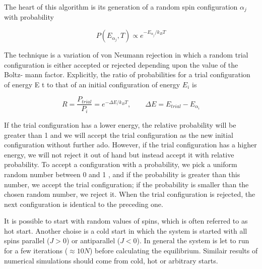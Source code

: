 \documentclass[12pt]{article}
\theoremstyle{plain}
\begin{document}
\vspace{2mm}

\par The heart of this algorithm is its generation of a random spin configuration $\alpha_j$ with
probability

\vspace{2mm}

\begin{equation*}
    P(E_{\alpha_j}, T) \propto e^{-E_{\alpha_j} / k_B T}
\end{equation*}

\vspace{2mm}

\par The technique is a variation of von Neumann rejection in which a
random trial configuration is either accepted or rejected depending upon the value of the Boltz-
mann factor. Explicitly, the ratio of probabilities for a trial configuration of energy E t to that
of an initial configuration of energy $E_i$ is

\vspace{2mm}

\begin{equation*}
    R = \frac{P_{trial}}{P_i} = e^{-\Delta E / k_B T}, \quad \quad \Delta E = E_{trial} - E_{\alpha_i}
\end{equation*}

\vspace{2mm}

\par If the trial configuration has a lower energy, the relative probability will be greater
than 1 and we will accept the trial configuration as the new initial configuration without further
ado. However, if the trial configuration has a higher energy, we will not reject it out
of hand but instead accept it with relative probability. To accept
a configuration with a probability, we pick a uniform random number between 0 and 1 , and if
the probability is greater than this number, we accept the trial configuration; if the probability
is smaller than the chosen random number, we reject it. When the trial
configuration is rejected, the next configuration is identical to the preceding one.

\vspace{2mm}

\par It is possible to start with random values of spins, which is often referred to as hot start.
Another choise is a cold start in which the system is started with all spins parallel ($J > 0$)
or antiparallel ($J < 0$). In general the system is let to run for a few iterations ($\approx 10N$)
before calculating the equilibrium. Similair results of numerical simulations should come from cold, hot
or arbitrary starts. \cite{landau}
\end{document}
